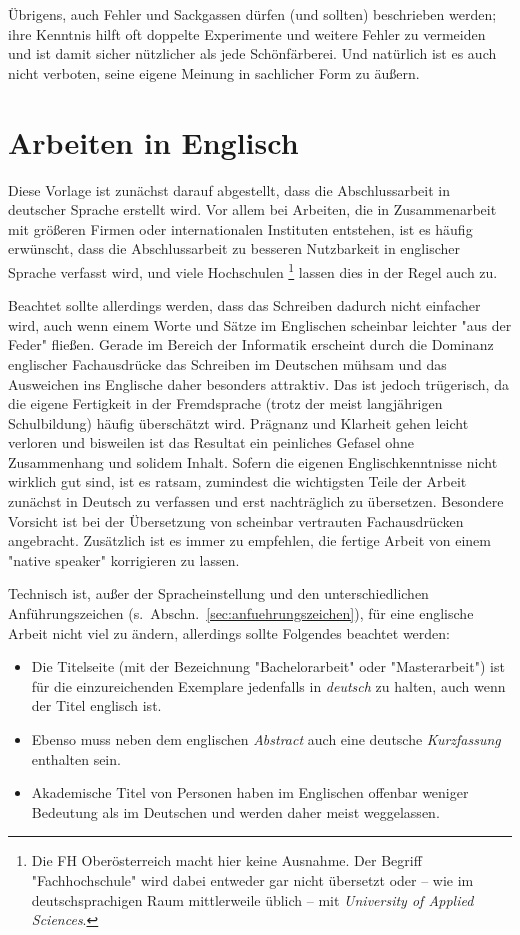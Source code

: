 Übrigens, auch Fehler und Sackgassen dürfen (und sollten)
beschrieben werden; ihre Kenntnis hilft oft doppelte Experimente und
weitere Fehler zu vermeiden und ist damit sicher nützlicher als
jede Schönfärberei.
Und natürlich ist es auch nicht verboten, seine eigene Meinung 
in sachlicher Form zu äußern.


\section{Arbeiten in Englisch}
\label{sec:englisch}

Diese Vorlage ist zunächst darauf abgestellt, dass die
Abschlussarbeit in deutscher Sprache erstellt wird. Vor allem bei
Arbeiten, die in Zusammenarbeit mit größeren Firmen oder
internationalen Instituten entstehen, ist es häufig erwünscht,
dass die Abschlussarbeit zu besseren Nutzbarkeit in englischer
Sprache verfasst wird, und viele Hochschulen%
\footnote{Die FH Oberösterreich macht hier keine Ausnahme. 
Der Begriff "Fachhochschule" wird dabei entweder gar nicht
übersetzt oder -- wie im deutschsprachigen Raum mittlerweile üblich -- 
mit \emph{University of Applied Sciences}.
} 
lassen dies in
der Regel auch zu.

Beachtet sollte allerdings werden, dass das Schreiben dadurch nicht
einfacher wird, auch wenn einem Worte und Sätze im Englischen
scheinbar leichter "aus der Feder" fließen. Gerade im Bereich
der Informatik erscheint durch die Dominanz englischer
Fachausdrücke das Schreiben im Deutschen mühsam und das Ausweichen
ins Englische daher besonders attraktiv. Das ist jedoch
trügerisch, da die eigene Fertigkeit in der Fremdsprache
(trotz der meist langjährigen Schulbildung) häufig überschätzt wird.
Prägnanz und Klarheit gehen leicht verloren und bisweilen ist das
Resultat ein peinliches Gefasel ohne Zusammenhang und solidem
Inhalt. Sofern die eigenen Englischkenntnisse nicht wirklich gut sind, ist
es ratsam, zumindest die wichtigsten Teile der Arbeit zunächst in
Deutsch zu verfassen und erst nachträglich zu übersetzen.
Besondere Vorsicht ist bei der Übersetzung von scheinbar
vertrauten Fachausdrücken angebracht. Zusätzlich ist es immer zu
empfehlen, die fertige Arbeit von einem "native speaker"
korrigieren zu lassen.



Technisch ist, außer der Spracheinstellung und den
unterschiedlichen Anführungszeichen (s.\
Abschn.~\ref{sec:anfuehrungszeichen}), für eine englische Arbeit
nicht viel zu ändern, allerdings sollte Folgendes beachtet werden:
%
\begin{itemize}
\item  Die Titelseite (mit der Bezeichnung "Bachelorarbeit" oder "Masterarbeit") 
ist für die einzureichenden Exemplare jedenfalls in \emph{deutsch} zu halten,
auch wenn der Titel englisch ist. 
\item Ebenso muss neben dem
englischen \emph{Abstract} auch eine deutsche \emph{Kurzfassung}
enthalten sein. %
\item Akademische Titel von Personen haben im Englischen offenbar
weniger Bedeutung als im Deutschen und werden daher meist
weggelassen.
\end{itemize}
